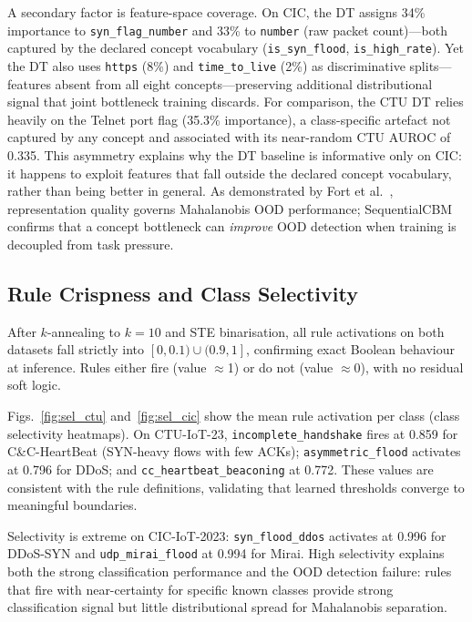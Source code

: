 \documentclass[journal]{IEEEtran}
\begin{document}
A secondary factor is feature-space coverage. On CIC, the DT assigns
34\% importance to \texttt{syn\_flag\_number} and 33\% to
\texttt{number} (raw packet count)---both captured by the declared
concept vocabulary (\texttt{is\_syn\_flood}, \texttt{is\_high\_rate}).
Yet the DT also uses \texttt{https} (8\%) and \texttt{time\_to\_live}
(2\%) as discriminative splits---features absent from all eight
concepts---preserving additional distributional signal that joint
bottleneck training discards. For comparison, the CTU DT relies heavily
on the Telnet port flag (35.3\% importance), a class-specific artefact
not captured by any concept and associated with its near-random CTU
AUROC of 0.335. This asymmetry explains why the DT baseline is
informative only on CIC: it happens to exploit features that fall
outside the declared concept vocabulary, rather than being better
in general. As demonstrated by Fort et al.~\cite{fort2021exploring},
representation quality governs Mahalanobis OOD performance; SequentialCBM
confirms that a concept bottleneck can \emph{improve} OOD detection
when training is decoupled from task pressure.

\subsection{Rule Crispness and Class Selectivity}

After $k$-annealing to $k{=}10$ and STE binarisation, all rule
activations on both datasets fall strictly into $[0,0.1)\cup(0.9,1]$,
confirming exact Boolean behaviour at inference. Rules either fire
(value $\approx$1) or do not (value $\approx$0), with no residual soft
logic.

\begin{sloppypar}
Figs.~\ref{fig:sel_ctu} and~\ref{fig:sel_cic} show the mean rule
activation per class (class selectivity heatmaps). On CTU-IoT-23,
\texttt{incomplete\_handshake} fires at 0.859 for C\&C-HeartBeat
(SYN-heavy flows with few ACKs); \texttt{asymmetric\_flood} activates
at 0.796 for DDoS; and \texttt{cc\_heartbeat\_beaconing} at 0.772.
These values are consistent with the rule definitions,
validating that learned thresholds converge to meaningful boundaries.

Selectivity is extreme on CIC-IoT-2023: \texttt{syn\_flood\_ddos}
activates at 0.996 for DDoS-SYN and \texttt{udp\_mirai\_flood} at
0.994 for Mirai. High selectivity explains both the strong
classification performance and the OOD detection failure: rules that
fire with near-certainty for specific known classes provide strong
classification signal but little distributional spread for Mahalanobis
separation.
\end{sloppypar}
\end{document}
